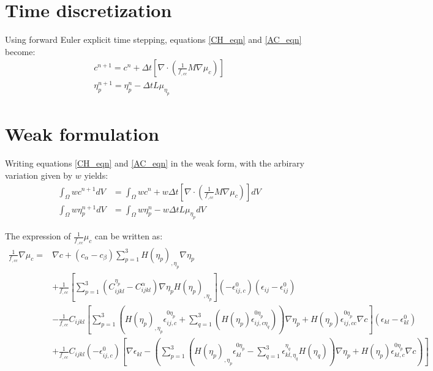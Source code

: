 \documentclass[11pt]{article}
\renewcommand{\=}[1]{\stackrel{#1}{=}} %
\theoremstyle{definition}
\theoremstyle{remark}
\begin{document}
\section{Time discretization}
Using forward Euler explicit time stepping, equations \ref{CH_eqn} and \ref{AC_eqn} become:
\begin{align}
c^{n+1} = c^{n}+\Delta t \left[\nabla \cdot \left(\frac{1}{f_{,cc}} M \nabla \mu_c \right) \right]\\
\eta_p^{n+1} = \eta_p^n -\Delta t L \mu_{\eta_p}
\end{align}

\section{Weak formulation}
Writing equations \ref{CH_eqn} and \ref{AC_eqn} in the weak form, with the arbirary variation given by $w$ yields:
\begin{align}
\int_\Omega w c^{n+1} dV &= \int_\Omega wc^{n}+w  \Delta t \left[\nabla \cdot \left(\frac{1}{f_{,cc}}  M \nabla \mu_c \right) \right] dV \label{CH_weak} \\
\int_\Omega w \eta_p^{n+1} dV &= \int_\Omega w \eta_p^{n}-w  \Delta t L \mu_{\eta_p} dV  \label{AC_weak}
\end{align}

The expression of $\frac{1}{f_{,cc}} \mu_c$ can be written as:
\begin{equation}
\begin{split}
\frac{1}{f_{,cc}}  \nabla \mu_c = & \nabla c + (c_{\alpha}-c_{\beta}) \sum_{p=1}^3 H(\eta_p)_{,\eta_p} \nabla \eta_p  \\
&+ \frac{1}{f_{,cc}} \left[ \sum_{p=1}^3 (C_{ijkl}^{\eta_p} - C_{ijkl}^{\alpha} )\nabla \eta_p H(\eta_p)_{,\eta_p} \right](-\epsilon_{ij,c}^0)(\epsilon_{ij} - \epsilon_{ij}^0) \\
&- \frac{1}{f_{,cc}} C_{ijkl} \left[  \sum_{p=1}^3 \left( H(\eta_p)_{,\eta_p} \epsilon_{ij,c}^{0\eta_p} + \sum_{q=1}^3 \left( H(\eta_p) \epsilon_{ij,c\eta_q}^{0\eta_p} \right) \right) \nabla \eta_p + H(\eta_p) \epsilon_{ij,cc}^{0\eta_p} \nabla c \right](\epsilon_{kl}-\epsilon_{kl}^0)\\
&+ \frac{1}{f_{,cc}} C_{ijkl} (-\epsilon_{ij,c}^0) \left[ \nabla \epsilon_{kl} -  \left( \sum_{p=1}^3 \left(H(\eta_p)_{,\eta_p} \epsilon_{kl}^{0\eta_p} -\sum_{q=1}^3 \epsilon_{kl,\eta_q}^{\eta_q} H(\eta_q) \right)\nabla \eta_p + H(\eta_p) \epsilon_{kl,c}^{0\eta_p} \nabla c \right) \right]
\end{split}
\end{equation}
\end{document}
